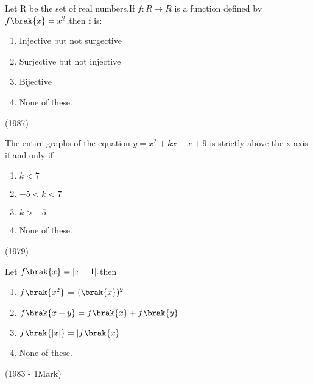 \iffalse
\title{Assignment}
  \author{M. Ranjith}
  \section{mcq-single}
\fi
  \item Let R be the set of real numbers.If $f:R \mapsto R $ is 
  a function defined by$f\brak{x}= x^2 $,then f is:

    \begin{multicols}{2}
      \begin{enumerate}
          
        \item Injective but not surgective 
        
        \item Surjective but not injective
        
        \item Bijective
        
        \item None of these.
      \end{enumerate}
    \end{multicols}

  \hfill
  (1987)


 


  \item The entire graphs of the equation $y= x{^2}+ kx - x +9$ is strictly above the x-axis 
  if and only if
    \begin{multicols}{2}
      \begin{enumerate}
          


        \item $k<7$
        
        \item $-5<k<7$
        
        \item $k>-5$
        
        \item None of these.
      \end{enumerate}
    \end{multicols}
  \hfill
  (1979)


\item Let $f\brak{x}=|x-1|.$then
  \begin{multicols}{2}
      \begin{enumerate}
      \item $f\brak{x^2}$ = $(\brak{x})^2$

      \item  $f\brak{x+y}=f\brak{x}+f\brak{y}$

      \item $f\brak{|x|}=|f\brak{x}|$

      \item None of these.
      \end{enumerate}
  \end{multicols}
  \hfill
  (1983 - 1Mark)



